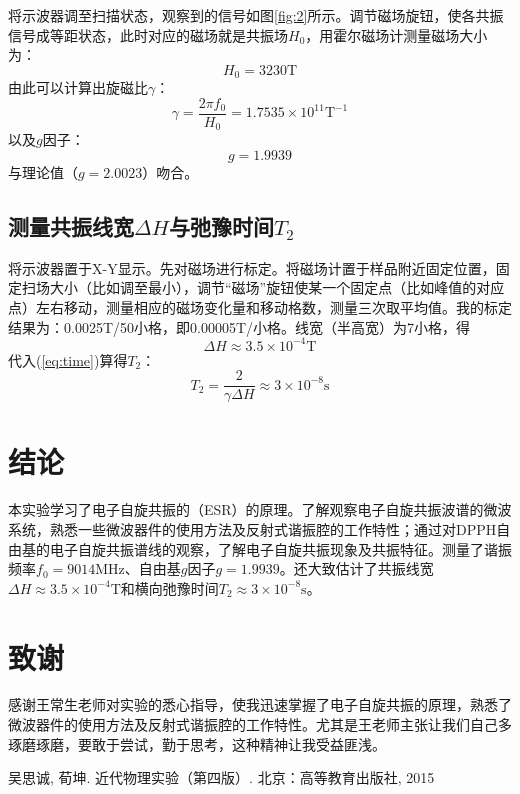 \documentclass[aps,pre,12pt,preprint,onecolumn,showpacs,showkeys]{revtex4-1}
\begin{document}
    将示波器调至扫描状态，观察到的信号如图\ref{fig:2}所示。调节磁场旋钮，使各共振信号成等距状态，此时对应的磁场就是共振场$H_0$，用霍尔磁场计测量磁场大小为：
    \begin{equation}
        H_0 = 3230 \mathrm T
    \end{equation}
    由此可以计算出旋磁比$\gamma$：
    \begin{equation}
        \gamma=\frac{2 \pi f_0}{H_0}=1.7535 \times 10^{11} \mathrm T ^{-1}
    \end{equation}
    以及$g$因子：
    \begin{equation}
        g=1.9939
    \end{equation}
    与理论值（$g=2.0023$）吻合。

    \subsection{测量共振线宽$\Delta H$与弛豫时间$T_2$}\label{biaoding}
    将示波器置于X-Y显示。先对磁场进行标定。将磁场计置于样品附近固定位置，固定扫场大小（比如调至最小），调节“磁场”旋钮使某一个固定点（比如峰值的对应点）左右移动，测量相应的磁场变化量和移动格数，测量三次取平均值。我的标定结果为：0.0025T/50小格，即0.00005T/小格。线宽（半高宽）为7小格，得
    \begin{equation}
        \Delta H \approx 3.5 \times 10^{-4} \mathrm T
    \end{equation}
    代入(\ref{eq:time})算得$T_2$：
    \begin{equation}
        T_2 = \frac{2} {\gamma \Delta H}\approx 3 \times 10 ^{-8} \mathrm s
    \end{equation}

\section{结论}
    本实验学习了电子自旋共振的（ESR）的原理。了解观察电子自旋共振波谱的微波系统，熟悉一些微波器件的使用方法及反射式谐振腔的工作特性；通过对DPPH自由基的电子自旋共振谱线的观察，了解电子自旋共振现象及共振特征。测量了谐振频率$f_0=9014 \mathrm{MHz}$、自由基$g$因子$g=1.9939$。还大致估计了共振线宽$\Delta H \approx 3.5 \times 10^{-4} \mathrm T $和横向弛豫时间$T_2\approx 3 \times 10 ^{-8} \mathrm s$。

\section{致谢}
    感谢王常生老师对实验的悉心指导，使我迅速掌握了电子自旋共振的原理，熟悉了微波器件的使用方法及反射式谐振腔的工作特性。尤其是王老师主张让我们自己多琢磨琢磨，要敢于尝试，勤于思考，这种精神让我受益匪浅。
    
\begin{thebibliography}{}
 吴思诚, 荀坤. 近代物理实验（第四版）. 北京：高等教育出版社, 2015
\end{thebibliography}
\end{document}
